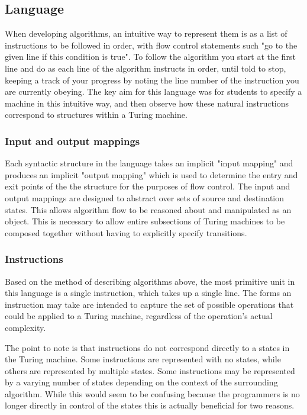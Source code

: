 \documentclass[11pt]{article}
\begin{document}
\subsection{Language}

When developing algorithms, an intuitive way to represent them is as a list of instructions to be followed in order, with flow control statements such "go to the given line if this condition is true". To follow the algorithm you start at the first line and do as each line of the algorithm instructs in order, until told to stop, keeping a track of your progress by noting the line number of the instruction you are currently obeying. The key aim for this language was for students to specify a machine in this intuitive way, and then observe how these natural instructions correspond to structures within a Turing machine.

\subsubsection{Input and output mappings}

Each syntactic structure in the language takes an implicit "input mapping" and produces an implicit "output mapping" which is used to determine the entry and exit points of the the structure for the purposes of flow control. The input and output mappings are designed to abstract over sets of source and destination states. This allows algorithm flow to be reasoned about and manipulated as an object. This is necessary to allow entire subsections of Turing machines to be composed together without having to explicitly specify transitions.

\subsubsection{Instructions}

Based on the method of describing algorithms above, the most primitive unit in this language is a single instruction, which takes up a single line. The forms an instruction may take are intended to capture the set of possible operations that could be applied to a Turing machine, regardless of the operation's actual complexity.

The point to note is that instructions do not correspond directly to a states in the Turing machine. Some instructions are represented with no states, while others are represented by multiple states. Some instructions may be represented by a varying number of states depending on the context of the surrounding algorithm. While this would seem to be confusing because the programmers is no longer directly in control of the states this is actually beneficial for two reasons. 
\end{document}
